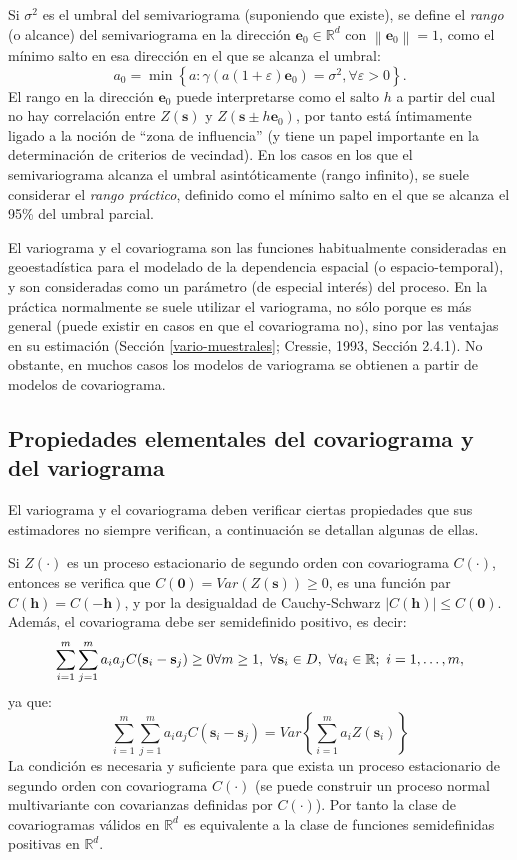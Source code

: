 \documentclass[
]{book}
\theoremstyle{break}
\theoremstyle{definition}
\theoremstyle{definition}
\theoremstyle{definition}
\theoremstyle{definition}
\theoremstyle{remark}
\begin{document}
Si \(\sigma ^{2}\) es el umbral del semivariograma (suponiendo que existe), se define el \emph{rango} (o alcance) del semivariograma en la dirección \(\mathbf{e}_0 \in \mathbb{R}^{d}\) con \(\left\| \mathbf{e}_0 \right\| = 1\), como el mínimo salto en esa dirección en el que se alcanza el umbral:
\[a_0 =\min \left\{ a:\gamma (a\left( 1+\varepsilon \right) \mathbf{e}_0 )=\sigma ^{2} , \forall \varepsilon >0\right\}.\]
El rango en la dirección \(\mathbf{e}_0\) puede interpretarse como el salto \(h\) a partir del cual no hay correlación entre \(Z(\mathbf{s})\) y \(Z(\mathbf{s}\pm h\mathbf{e}_0)\), por tanto está íntimamente ligado a la noción de ``zona de influencia'' (y tiene un papel importante en la determinación de criterios de vecindad).
En los casos en los que el semivariograma alcanza el umbral asintóticamente (rango infinito), se suele considerar el \emph{rango práctico}, definido como el mínimo salto en el que se alcanza el 95\% del umbral parcial.

El variograma y el covariograma son las funciones habitualmente consideradas en geoestadística para el modelado de la dependencia espacial (o espacio-temporal), y son consideradas como un parámetro (de especial interés) del proceso.
En la práctica normalmente se suele utilizar el variograma, no sólo porque es más general (puede existir en casos en que el covariograma no), sino por las ventajas en su estimación (Sección \ref{vario-muestrales}; Cressie, 1993, Sección 2.4.1).
No obstante, en muchos casos los modelos de variograma se obtienen a partir de modelos de covariograma.

\subsection{Propiedades elementales del covariograma y del variograma}\label{propiedades-elementales}

El variograma y el covariograma deben verificar ciertas propiedades que sus estimadores no siempre verifican, a continuación se detallan algunas de ellas.

Si \(Z(\cdot)\) es un proceso estacionario de segundo orden con covariograma \(C(\cdot)\),
entonces se verifica que \(C(\mathbf{0}) = Var( Z(\mathbf{s}) ) \geq 0\), es una función par \(C(\mathbf{h})=C(-\mathbf{h})\), y por la desigualdad de Cauchy-Schwarz \(\left| C(\mathbf{h})\right| \leq C(\mathbf{0})\).
Además, el covariograma debe ser semidefinido positivo, es decir:
\[\sum\limits_{i=1}^{m} \sum\limits_{j=1}^{m} a_i a_j C(\mathbf{s}_i-\mathbf{s}_j) \geq 0  \\
\forall m\geq 1,\ \forall \mathbf{s}_i \in D,\ \forall a_i \in \mathbb{R};\ i=1, \ldots,m,\]
ya que:
\[\sum\limits_{i=1}^{m}\sum\limits_{j=1}^{m}a_i a_j C(\mathbf{s}_i -\mathbf{s}_j) = Var\left\{\sum\limits_{i=1}^{m}a_i Z(\mathbf{s}_i) \right\}\]
La condición es necesaria y suficiente para que exista un proceso estacionario de segundo orden con covariograma \(C(\cdot)\) (se puede construir un proceso normal multivariante con covarianzas definidas por \(C(\cdot)\)).
Por tanto la clase de covariogramas válidos en \(\mathbb{R}^d\) es equivalente a la clase de funciones semidefinidas positivas en \(\mathbb{R}^d\).
\end{document}

